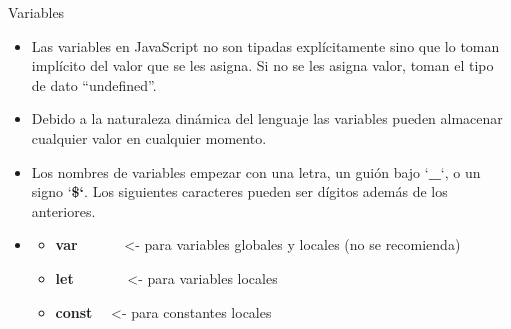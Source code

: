 \documentclass[aspectratio=43,10pt,t]{beamer}
\begin{document}
\begin{frame}{Variables}\relax
\begingroup
{}
\begin{itemize}
  \item Las variables en JavaScript no son tipadas explícitamente sino que lo toman implícito del valor que se les asigna. Si no se les asigna valor, toman el tipo de dato “undefined”.
  \item Debido a la naturaleza dinámica del lenguaje las variables pueden almacenar cualquier valor en cualquier momento.
  \item Los nombres de variables empezar con una letra, un guión bajo `\textbf{\_}`, o un signo `\textbf{\$`}. Los siguientes caracteres pueden ser dígitos además de los anteriores.
  \item {}
  \begin{itemize}
    \item \textbf{var} ~~~~~~<- para variables globales y locales (no se recomienda)
    \item \textbf{let} ~~~~~~~<- para variables locales
    \item \textbf{const} ~~<- para constantes locales
  \end{itemize}
\end{itemize}
\endgroup
{}
\end{frame}
\end{document}
